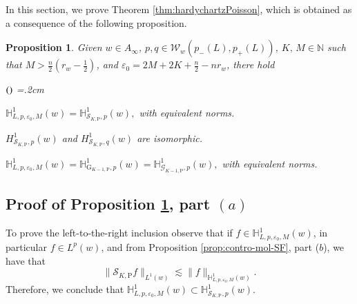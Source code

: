 \documentclass[11pt, a4paper,leqno]{amsart}
\theoremstyle{plain}
\newtheorem{proposition}[equation]{Proposition}
\theoremstyle{definition}
\theoremstyle{remark}
\numberwithin{equation}{section}
\def \N{ \mathbb{N} }
\def \Scal{ \mathcal{S} }
\def \pp{ \mathrm{P} }
\def \Gcal { \mathcal{G} }
\def \Grm{ \mathrm{G} }
\begin{document}
In this section, we prove Theorem \ref{thm:hardychartzPoisson},
which is obtained as a consequence of the following proposition.
\begin{proposition}\label{lemma:SKP}
Given $w\in A_{\infty}$, $p,q\in \mathcal{W}_w(p_-(L),p_+(L))$, $K,\,M \in \N$
such that $M>\frac{n}{2}\left(r_w-\frac{1}{2}\right)$, and
$\varepsilon_0=2M+2K+\frac{n}{2}-nr_w$, there hold
\begin{list}{$(\theenumi)$}{\leftmargin=1cm \itemsep=0.2cm\topsep=.2cm \renewcommand{\theenumi}{\alph{enumi}}}
\item $\mathbb{H}^1_{L,p,\varepsilon_0,M}(w)= \mathbb{H}^1_{\Scal_{K,\pp},p}(w),$
with equivalent norms.

\item 
$
H^1_{\Scal_{K,\pp},p}(w)$ and $H_{\Scal_{K,\pp},q}^1(w)
$ are isomorphic.

\item  $
\mathbb{H}_{L,p,\varepsilon_0,M}^1(w)= \mathbb{H}_{\Grm_{K-1,\pp},p}^1(w)= \mathbb{H}_{\Gcal_{K-1,\pp},p}^1(w),
$  with equivalent norms.
\end{list}
\end{proposition}


\subsection{ Proof of Proposition \ref{lemma:SKP}, part $(a)$}
To prove the left-to-the-right inclusion observe that if
$f\in \mathbb{H}_{L,p,\varepsilon_0,M}^1(w)$, in particular $f\in L^p(w)$, and from Proposition \ref{prop:contro-mol-SF}, part ($b$), we have that
    $$
    \|\Scal_{K,\pp}f\|_{L^1(w)}\lesssim \|f\|_{\mathbb{H}^1_{L,p,\varepsilon_0,M}(w)}.
    $$
Therefore, we conclude that
$
\mathbb{H}_{L,p,\varepsilon_0,M}^1(w)\subset\mathbb{H}^1_{\Scal_{K,\pp},p}(w).
$


\medskip
\end{document}

